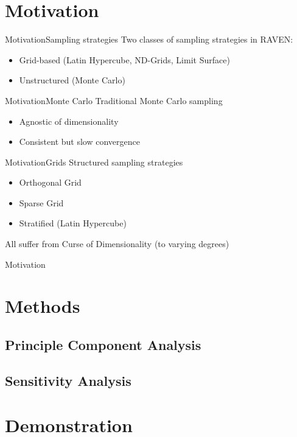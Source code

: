 \documentclass{beamer}
\begin{document}
\section{Motivation}
\begin{frame}{Motivation}{Sampling strategies}\vspace{-30pt}
  Two classes of sampling strategies in RAVEN:
  \begin{itemize}
    \item Grid-based (Latin Hypercube, ND-Grids, Limit Surface)
    \item Unstructured (Monte Carlo)
  \end{itemize}
\end{frame}

\begin{frame}{Motivation}{Monte Carlo}\vspace{-30pt}
  Traditional Monte Carlo sampling
  \begin{itemize}
    \item Agnostic of dimensionality
    \item Consistent but slow convergence
  \end{itemize}
\end{frame}

\begin{frame}{Motivation}{Grids}\vspace{-30pt}
  Structured sampling strategies
  \begin{itemize}
    \item Orthogonal Grid
    \item Sparse Grid
    \item Stratified (Latin Hypercube)
  \end{itemize}
  All suffer from Curse of Dimensionality (to varying degrees)
\end{frame}

\begin{frame}{Motivation}{}\vspace{-30pt}
\end{frame}
\section{Methods}


\subsection{Principle Component Analysis}


\subsection{Sensitivity Analysis}


\section{Demonstration}
\end{document}
